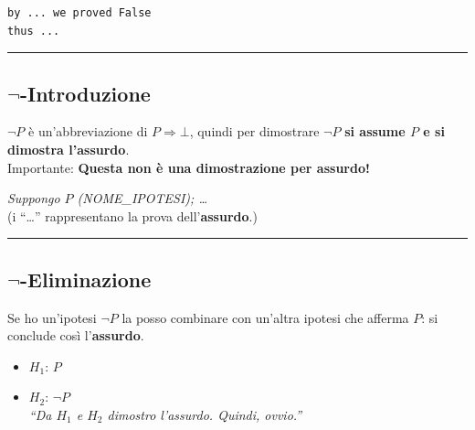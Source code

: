\documentclass[
  a4paper,
]{article}
\providecommand{\tightlist}{%
  \setlength{\itemsep}{0pt}\setlength{\parskip}{0pt}}
\begin{document}
\begin{examplebox}

\begin{lstlisting}
by ... we proved False
thus ...
\end{lstlisting}

\end{examplebox}

\par\noindent\rule{\linewidth}{0.4pt}\par\vspace{6pt}

\hypertarget{lnot-introduzione}{%
\subsection{\texorpdfstring{\(\lnot\)-Introduzione}{\textbackslash lnot-Introduzione}}\label{lnot-introduzione}}

\(\lnot P\) è un'abbreviazione di \(P \Rightarrow \bot\), quindi per
dimostrare \(\lnot P\) \textbf{si assume \(P\) e si dimostra
l'assurdo}.\\
Importante: \textbf{Questa non è una dimostrazione per assurdo!}

\begin{examplebox}[Esempio]

\emph{Suppongo \(P\) (NOME\_IPOTESI); \ldots{}}\\
(i ``\ldots{}'' rappresentano la prova dell'\textbf{assurdo}.)

\end{examplebox}

\par\noindent\rule{\linewidth}{0.4pt}\par\vspace{6pt}

\hypertarget{lnot-eliminazione}{%
\subsection{\texorpdfstring{\(\lnot\)-Eliminazione}{\textbackslash lnot-Eliminazione}}\label{lnot-eliminazione}}

Se ho un'ipotesi \(\lnot P\) la posso combinare con un'altra ipotesi che
afferma \(P\): si conclude così l'\textbf{assurdo}.

\begin{examplebox}[Esempio]

\begin{itemize}
\tightlist
\item
  \(H_1\): \(P\)\\
\item
  \(H_2\): \(\lnot P\)\\
  \emph{``Da \(H_1\) e \(H_2\) dimostro l'assurdo. Quindi, ovvio.''}
\end{itemize}

\end{examplebox}
\end{document}
